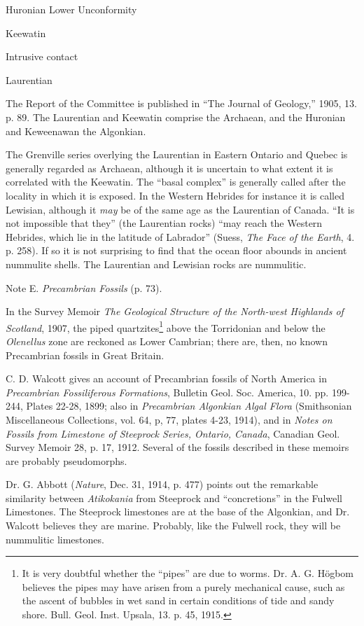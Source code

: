 \documentclass[a4paper, 12pt, oneside]{article}
\begin{document}
Huronian Lower Unconformity

Keewatin

Intrusive contact

Laurentian

The Report of the Committee is published in ``The Journal of Geology,'' 1905, 13. p. 89. The Laurentian and Keewatin comprise the Archaean, and the Huronian and Keweenawan the Algonkian.

The Grenville series overlying the Laurentian in Eastern Ontario and Quebec is generally regarded as Archaean, although it is uncertain to what extent it is correlated with the Keewatin. The ``basal complex'' is generally called after the locality in which it is exposed. In the Western Hebrides for instance it is called Lewisian, although it \emph{may} be of the same age as the Laurentian of Canada. ``It is not impossible that they'' (the Laurentian rocks) ``may reach the Western Hebrides, which lie in the latitude of Labrador'' (Suess, \emph{The Face of the Earth}, 4. p. 258). If so it is not surprising to find that the ocean floor abounds in ancient nummulite shells. The Laurentian and Lewisian rocks are nummulitic.

Note E. \emph{Precambrian Fossils} (p. 73).

In the Survey Memoir \emph{The Geological Structure of the North-west Highlands of Scotland}, 1907, the piped quartzites\footnote{It is very doubtful whether the ``pipes'' are due to worms. Dr. A. G. Högbom believes the pipes may have arisen from a purely mechanical cause, such as the ascent of bubbles in wet sand in certain conditions of tide and sandy shore. Bull. Geol. Inst. Upsala, 13. p. 45, 1915.} above the Torridonian and below the \emph{Olenellus} zone are reckoned as Lower Cambrian; there are, then, no known Precambrian fossils in Great Britain.

C. D. Walcott gives an account of Precambrian fossils of North America in \emph{Precambrian Fossiliferous Formations}, Bulletin Geol. Soc. America, 10. pp. 199-244, Plates 22-28, 1899; also in \emph{Precambrian Algonkian Algal Flora} (Smithsonian Miscellaneous Collections, vol. 64, p, 77, plates 4-23, 1914), and in \emph{Notes on Fossils from Limestone of Steeprock Series, Ontario, Canada}, Canadian Geol. Survey Memoir 28, p. 17, 1912. Several of the fossils described in these memoirs are probably pseudomorphs.

Dr. G. Abbott (\emph{Nature}, Dec. 31, 1914, p. 477) points out the remarkable similarity between \emph{Atikokania} from Steeprock and ``concretions'' in the Fulwell Limestones. The Steeprock limestones are at the base of the Algonkian, and Dr. Walcott believes they are marine. Probably, like the Fulwell rock, they will be nummulitic limestones.
\end{document}
